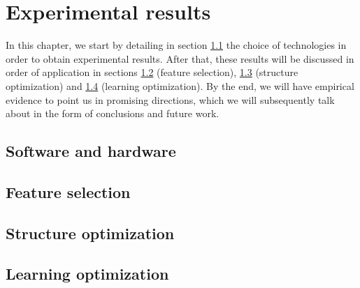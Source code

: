 \chapter{Experimental results}\label{ch:experiments}

In this chapter, we start by detailing in section \ref{sec:technologies} the choice of technologies in order to obtain experimental results. After that, these results will be discussed in order of application in sections \ref{sec:res_fs} (feature selection), \ref{sec:res_so} (structure optimization) and \ref{sec:res_lo} (learning optimization). By the end, we will have empirical evidence to point us in promising directions, which we will subsequently talk about in the form of conclusions and future work.

\section{Software and hardware}\label{sec:technologies}

\section{Feature selection}\label{sec:res_fs}

\section{Structure optimization}\label{sec:res_so}

\section{Learning optimization}\label{sec:res_lo}